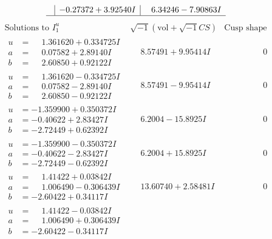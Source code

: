 \documentclass[1p]{elsarticle_modified}
\theoremstyle{definition}
\newcommand{\I}{\sqrt{-1}}
\begin{document}
$$\begin{array}{c|c|c}
 & -0.27372 + 3.92540 I & \phantom{-}6.34246 - 7.90863 I\\
 \hline 
 \end{array}$$\newpage$$\begin{array}{c|c|c}  
\text{Solutions to }I^u_{1}& \I (\text{vol} + \sqrt{-1}CS) & \text{Cusp shape}\\
 \hline 
\begin{aligned}
u &= \phantom{-}1.361620 + 0.334725 I \\
a &= \phantom{-}0.07582 + 2.89140 I \\
b &= \phantom{-}2.60850 + 0.92122 I\end{aligned}
 & \phantom{-}8.57491 + 9.95414 I & \phantom{-0.000000 } 0 \\ \hline\begin{aligned}
u &= \phantom{-}1.361620 - 0.334725 I \\
a &= \phantom{-}0.07582 - 2.89140 I \\
b &= \phantom{-}2.60850 - 0.92122 I\end{aligned}
 & \phantom{-}8.57491 - 9.95414 I & \phantom{-0.000000 } 0 \\ \hline\begin{aligned}
u &= -1.359900 + 0.350372 I \\
a &= -0.40622 + 2.83427 I \\
b &= -2.72449 + 0.62392 I\end{aligned}
 & \phantom{-}6.2004 - 15.8925 I & \phantom{-0.000000 } 0 \\ \hline\begin{aligned}
u &= -1.359900 - 0.350372 I \\
a &= -0.40622 - 2.83427 I \\
b &= -2.72449 - 0.62392 I\end{aligned}
 & \phantom{-}6.2004 + 15.8925 I & \phantom{-0.000000 } 0 \\ \hline\begin{aligned}
u &= \phantom{-}1.41422 + 0.03842 I \\
a &= \phantom{-}1.006490 - 0.306439 I \\
b &= -2.60422 + 0.34117 I\end{aligned}
 & \phantom{-}13.60740 + 2.58481 I & \phantom{-0.000000 } 0 \\ \hline\begin{aligned}
u &= \phantom{-}1.41422 - 0.03842 I \\
a &= \phantom{-}1.006490 + 0.306439 I \\
b &= -2.60422 - 0.34117 I\end{aligned}

\end{array}$$
\end{document}

